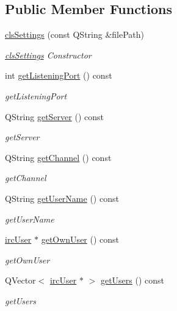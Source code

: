 \subsection*{Public Member Functions}
\begin{DoxyCompactItemize}
\item 
\hyperlink{classserver_1_1cls_settings_aba9713d2408ce6ae7acb28a36647ebaf}{cls\-Settings} (const Q\-String \&file\-Path)
\begin{DoxyCompactList}\small\item\em \hyperlink{classserver_1_1cls_settings}{cls\-Settings} Constructor \end{DoxyCompactList}\item 
int \hyperlink{classserver_1_1cls_settings_a602fc63e38ce02cbac95414b506422f6}{get\-Listening\-Port} () const 
\begin{DoxyCompactList}\small\item\em get\-Listening\-Port \end{DoxyCompactList}\item 
Q\-String \hyperlink{classserver_1_1cls_settings_a8c004b75e4b5a0770eab757556896754}{get\-Server} () const 
\begin{DoxyCompactList}\small\item\em get\-Server \end{DoxyCompactList}\item 
Q\-String \hyperlink{classserver_1_1cls_settings_aeda4880e005f6f7de1b6fd0a31f78de6}{get\-Channel} () const 
\begin{DoxyCompactList}\small\item\em get\-Channel \end{DoxyCompactList}\item 
Q\-String \hyperlink{classserver_1_1cls_settings_ab63cf5761cd958b9dea502caaecd268d}{get\-User\-Name} () const 
\begin{DoxyCompactList}\small\item\em get\-User\-Name \end{DoxyCompactList}\item 
\hyperlink{classserver_1_1irc_user}{irc\-User} $\ast$ \hyperlink{classserver_1_1cls_settings_afcd5b687d43d225219f78f532b88e1a0}{get\-Own\-User} () const 
\begin{DoxyCompactList}\small\item\em get\-Own\-User \end{DoxyCompactList}\item 
Q\-Vector$<$ \hyperlink{classserver_1_1irc_user}{irc\-User} $\ast$ $>$ \hyperlink{classserver_1_1cls_settings_a5a0d72a0acc847fcfb9aaebb2b51af6f}{get\-Users} () const 
\begin{DoxyCompactList}\small\item\em get\-Users \end{DoxyCompactList}\end{DoxyCompactItemize}

